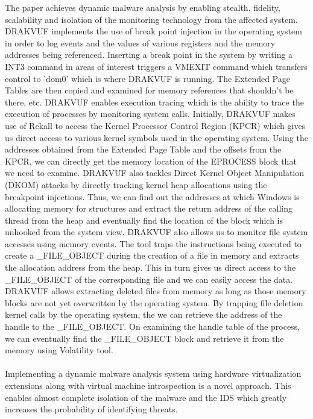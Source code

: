 \documentclass[11pt]{article}
\begin{document}
	The paper achieves dynamic malware analysis by enabling stealth, fidelity, scalability and isolation of the monitoring technology from the affected system. DRAKVUF implements the use of break point injection in the operating system in order to log events and the values of various registers and the memory addresses being referenced. Inserting a break point in the system by writing a INT3 command in areas of interest triggers a VMEXIT command which transfers control to 'dom0' which is where DRAKVUF is running. The Extended Page Tables are then copied and examined for memory references that shouldn't be there, etc. DRAKVUF enables execution tracing which is the ability to trace the execution of processes by monitoring system calls. Initially, DRAKVUF makes use of Rekall to access the Kernel Processor Control Region (KPCR) which gives us direct access to various kernel symbols used in the operating system. Using the addresses obtained from the Extended Page Table and the offsets from the KPCR, we can directly get the memory location of the EPROCESS block that we need to examine. DRAKVUF also tackles Direct Kernel Object Manipulation (DKOM) attacks by directly tracking kernel heap allocations using the breakpoint injections. Thus, we can find out the addresses at which Windows is allocating memory for structures and extract the return address of the calling thread from the heap and eventually find the location of the block which is unhooked from the system view. DRAKVUF also allows us to monitor file system accesses using memory events. The tool traps the instructions being executed to create a \_FILE\_OBJECT during the creation of a file in memory and extracts the allocation address from the heap. This in turn gives us direct access to the \_FILE\_OBJECT of the corresponding file and we can easily access the data. DRAKVUF allows extracting deleted files from memory as long as those memory blocks are not yet overwritten by the operating system. By trapping file deletion kernel calls by the operating system, the we can retrieve the address of the handle to the \_FILE\_OBJECT. On examining the handle table of the process, we can eventually find the \_FILE\_OBJECT block and retrieve it from the memory using Volatility tool.\\ \\
	Implementing a dynamic malware analysis system using hardware virtualization extensions along with virtual machine introspection is a novel approach. This enables almost complete isolation of the malware and the IDS which greatly increases the probability of identifying threats.	
	
\end{document}
